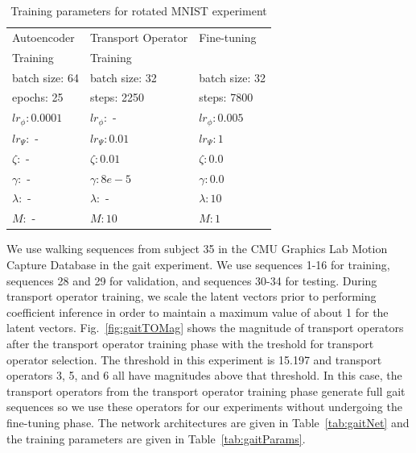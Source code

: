 \documentclass[letterpaper]{article} %
\begin{document}
\begin{table}[t]
\centering
\begin{tabular}{||l l l||}
\hline
Autoencoder & Transport Operator & Fine-tuning  \\
Training & Training & \\
\hline
batch size: 64 & batch size: 32 & batch size: 32  \\
epochs: 25 & steps: 2250 & steps: 7800  \\
$lr_{\phi}: 0.0001$ & $lr_{\phi}:$ - & $lr_{\phi}: 0.005$ \\
$lr_{\Psi}:$ - & $lr_{\Psi}: 0.01$  & $lr_{\Psi}: 1$ \\
$\zeta:$ - & $\zeta: 0.01$  & $\zeta: 0.0$ \\
$\gamma:$ - & $\gamma: 8e-5$  & $\gamma: 0.0$ \\
$\lambda:$ - & $\lambda:$ - & $\lambda: 10$ \\
$M:$ - & $M: 10$ & $M: 1$ \\
\hline
\end{tabular}
\caption{Training parameters for rotated MNIST experiment}
\label{tab:rotDigitParams}
\end{table}





We use walking sequences from subject 35 in the CMU Graphics Lab Motion Capture Database in the gait experiment. We use sequences 1-16 for training, sequences 28 and 29 for validation, and sequences 30-34 for testing. During transport operator training, we scale the latent vectors prior to performing coefficient inference in order to maintain a maximum value of about 1 for the latent vectors. Fig.~\ref{fig:gaitTOMag} shows the magnitude of transport operators after the transport operator training phase with the treshold for transport operator selection. The threshold in this experiment is 15.197 and transport operators 3, 5, and 6 all have magnitudes above that threshold. In this case, the transport operators from the transport operator training phase generate full gait sequences so we use these operators for our experiments without undergoing the fine-tuning phase. The network architectures are given in Table~\ref{tab:gaitNet} and the training parameters are given in Table~\ref{tab:gaitParams}.
\end{document}
